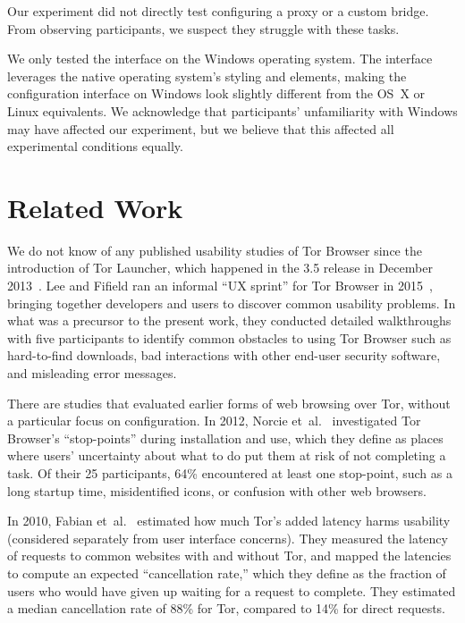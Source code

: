 \documentclass[USenglish,oneside,twocolumn]{article}
\begin{document}
Our experiment did not directly test configuring a proxy or a custom bridge. From observing participants, we suspect they struggle with these tasks. 

We only tested the interface on the Windows operating system. The interface leverages the native operating system's styling and elements, making the configuration interface on Windows look slightly different from the OS~X or Linux equivalents. We acknowledge that participants' unfamiliarity with Windows may have affected our experiment, but we believe that this affected all experimental conditions equally.  

\section{Related Work}
\label{sec:related} 

We do not know of any published usability studies of Tor Browser
since the introduction of Tor Launcher,
which happened in the 3.5 release in December 2013~\cite{torbrowser-35}.
Lee and Fifield ran an informal ``UX sprint''
for Tor Browser in 2015~\cite{uxsprint}, bringing together developers and users
to discover common usability problems.
In what was a precursor to the present work,
they conducted detailed walkthroughs with five participants
to identify common obstacles to using Tor Browser such as hard-to-find downloads,
bad interactions with other end-user security software,
and misleading error messages.

There are studies that evaluated earlier forms of web browsing over Tor,
without a particular focus on configuration.
In 2012, Norcie et~al.~\cite{norcie2012eliminating}
investigated Tor Browser's ``stop-points'' during installation and use,
which they define as places where users' uncertainty about what to do
put them at risk of not completing a task.
Of their 25 participants, 64\% encountered at least one stop-point,
such as a long startup time, misidentified icons, or confusion with other web browsers.

In 2010, Fabian et~al.~\cite{fabian2010privately}
estimated how much Tor's added latency harms usability
(considered separately from user interface concerns).
They measured the latency of requests to common websites with and without Tor,
and mapped the latencies to compute an expected ``cancellation rate,''
which they define as the fraction of users who would have given up waiting for a request to complete.
They estimated a median cancellation rate of 88\% for Tor, compared to 14\% for direct requests.
\end{document}
